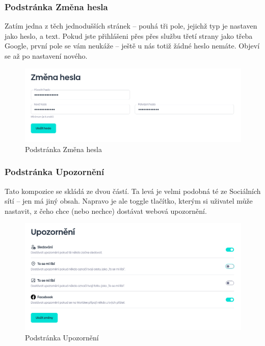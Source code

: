 \newpage
\subsubsection{Podstránka Změna hesla}
Zatím jedna z těch jednodušších stránek – pouhá tři pole, jejichž typ je nastaven jako heslo, a text. Pokud jste přihlášeni přes přes službu třetí strany jako třeba Google, první pole se vám neukáže – ještě u nás totiž žádné heslo nemáte. Objeví se až po nastavení nového.

\begin{figure}[!h]
    \centering
    \includegraphics[width=1\linewidth]{obrazky/change_password.png}
    \caption{Podstránka Změna hesla}
\end{figure}


\newpage
\subsubsection{Podstránka Upozornění}
Tato kompozice se skládá ze dvou částí. Ta levá je velmi podobná té ze Sociálních sítí – jen má jiný obsah. Napravo je ale toggle tlačítko, kterým si uživatel může nastavit, z čeho chce (nebo nechce) dostávat webová upozornění.

\begin{figure}[!h]
    \centering
    \includegraphics[width=1\linewidth]{obrazky/notify_settings.png}
    \caption{Podstránka Upozornění}
\end{figure}


